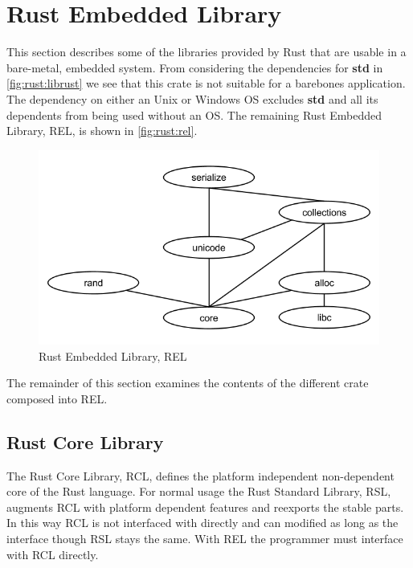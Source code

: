 \section{Rust Embedded Library}

This section describes some of the libraries provided by Rust that are usable in a bare-metal, embedded system.
From considering the dependencies for \textbf{std} in \autoref{fig:rust:librust} we see that this crate is not suitable for a barebones application.
The dependency on either an Unix or Windows OS excludes \textbf{std} and all its dependents from being used without an OS.
The remaining Rust Embedded Library, REL, is shown in \autoref{fig:rust:rel}.

\begin{figure}[H]
  \begin{center}
    \includegraphics[scale=0.3]{figures/background/rust/embedded-rust-lib.png}
  \end{center}
  \caption{Rust Embedded Library, REL}
  \label{fig:rust:rel}
\end{figure}

The remainder of this section examines the contents of the different crate composed into REL.

\subsection{Rust Core Library}

The Rust Core Library, RCL, defines the platform independent non-dependent core of the Rust language.
For normal usage the Rust Standard Library, RSL, augments RCL with platform dependent features and reexports the stable parts.
In this way RCL is not interfaced with directly and can modified as long as the interface though RSL stays the same.
With REL the programmer must interface with RCL directly.

